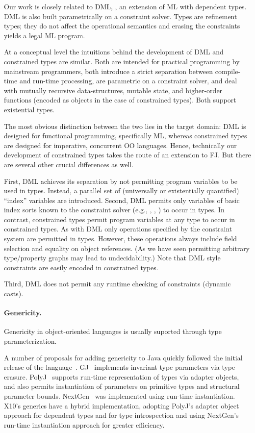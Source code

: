 Our work is closely related to DML, \cite{xi99dependent}, an
extension of ML with dependent types. DML is also built
parametrically on a constraint solver. Types are refinement types;
they do not affect the operational semantics and erasing the
constraints yields a legal ML program.

At a conceptual level the intuitions behind the development of DML
and constrained types are similar. Both are intended for practical
programming by mainstream programmers, both introduce a strict
separation between compile-time and run-time processing, are
parametric on a constraint solver, and deal with mutually recursive
data-structures, mutable state, and higher-order functions (encoded as
objects in the case of constrained types). Both support existential
types.

The most obvious distinction between the two lies in the target
domain: DML is designed for functional programming, specifically
ML, whereas constrained types are designed for imperative, concurrent
OO languages. Hence, technically our development of constrained types
takes the route of an extension to FJ. But there are several other
crucial differences as well.

First, DML achieves its separation by not permitting program
variables to be used in types. Instead, a parallel set of (universally
or existentially quantified) ``index'' variables are
introduced.
Second, DML permits only variables of basic index sorts known to
the constraint solver (e.g., , , ) to
occur in types. In contrast, constrained types permit program
variables at any type to occur in constrained types. As with DML
only operations specified by the constraint system are permitted in
types. However, these operations always include field selection and
equality on object references.  (As we have seen permitting arbitrary
type/property graphs may lead to undecidability.) Note that DML
style constraints are easily encoded in constrained types.

Third, DML does not permit any runtime checking of constraints
(dynamic casts).

\paragraph{Genericity.}

Genericity in object-oriented languages is usually
suported through
type parameterization.

A number of proposals 
for adding genericity to Java quickly followed
the initial release of
the language~\cite{GJ,Pizza,polyj,thorup97,allen03}.
GJ~\cite{GJ} implements invariant type
parameters via type erasure.
PolyJ~\cite{PolyJ} supports run-time representation of types
via adapter objects, and also permits instantiation of
parameters on primitive types and structural parameter bounds.
NextGen~\cite{allen03} was implemented using run-time 
instantiation.
X10's generics have a hybrid implementation, adopting PolyJ's
adapter object approach for dependent types and for 
type introspection and using NextGen's run-time
instantiation approach for greater efficiency.

